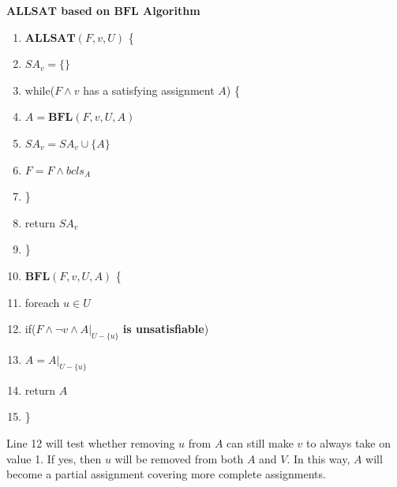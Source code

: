 \documentclass[journal]{IEEEtran}
\begin{document}
\begin{algo}
\textbf{$\boldsymbol{ALLSAT}$ based on $\boldsymbol{BFL}$ Algorithm}
\begin{enumerate}%
\item $\boldsymbol{ALLSAT}(F,v,U)$ \{
\item \hspace{0.3cm} $SA_v=\{\}$
\item \hspace{0.3cm} while($F\wedge v$ has a satisfying assignment $A$) \{
\item \hspace{0.6cm} $A= \boldsymbol{BFL}(F,v,U,A)$
\item \hspace{0.6cm} $SA_v= SA_v\cup \{A\}$
\item \hspace{0.6cm} $F= F\wedge bcls_A$
\item \hspace{0.3cm} \}
\item \hspace{0.3cm} return $SA_v$
\item \}
\item $\boldsymbol{BFL}(F,v,U,A)$ \{
\item \hspace{0.3cm} foreach $u\in U$
\item \hspace{0.6cm}  if($F\wedge \neg v\wedge A|_{U -\{u\}}$ \textbf{is unsatisfiable})
\item \hspace{0.9cm}     $A= A|_{U -\{u\}}$
\item \hspace{0.3cm} return $A$
\item \}
\end{enumerate}
\end{algo}

\vspace{0.2cm}

Line 12 will test whether removing $u$ from $A$ can still make $v$ to always take on value 1.
If yes, then $u$ will be removed from both $A$ and $V$.
In this way, $A$ will become a partial assignment covering more complete assignments.
\end{document}
